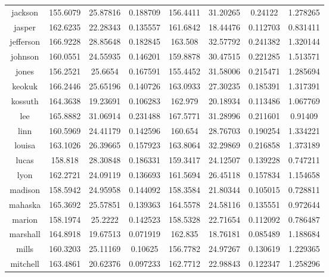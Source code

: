 \begin{table}[H]
\begin{tabular}{|c|ccc|ccc|c|}
jackson       & 155.6079 & 25.87816       & 0.188709 & 156.4411 & 31.20265       & 0.24122  & 1.278265 \\
jasper        & 162.6235 & 22.28343       & 0.135557 & 161.6842 & 18.44476       & 0.112703 & 0.831411 \\
jefferson     & 166.9228 & 28.85648       & 0.182845 & 163.508  & 32.57792       & 0.241382 & 1.320144 \\
johnson       & 160.0551 & 24.55935       & 0.146201 & 159.8878 & 30.47515       & 0.221285 & 1.513571 \\
jones         & 156.2521 & 25.6654        & 0.167591 & 155.4452 & 31.58006       & 0.215471 & 1.285694 \\
keokuk        & 166.2446 & 25.65196       & 0.140726 & 163.0933 & 27.30235       & 0.185391 & 1.317391 \\
kossuth       & 164.3638 & 19.23691       & 0.106283 & 162.979  & 20.18934       & 0.113486 & 1.067769 \\
lee           & 165.8882 & 31.06914       & 0.231488 & 167.5771 & 31.28996       & 0.211601 & 0.91409  \\
linn          & 160.5969 & 24.41179       & 0.142596 & 160.654  & 28.76703       & 0.190254 & 1.334221 \\
louisa        & 163.1026 & 26.39665       & 0.157923 & 163.8064 & 32.29869       & 0.216858 & 1.373189 \\
lucas         & 158.818  & 28.30848       & 0.186331 & 159.3417 & 24.12507       & 0.139228 & 0.747211 \\
lyon          & 162.2721 & 24.09119       & 0.136693 & 161.5694 & 26.45118       & 0.157834 & 1.154658 \\
madison       & 158.5942 & 24.95958       & 0.144092 & 158.3584 & 21.80344       & 0.105015 & 0.728811 \\
mahaska       & 165.3692 & 25.57851       & 0.139363 & 164.5578 & 24.58116       & 0.135551 & 0.972644 \\
marion        & 158.1974 & 25.2222        & 0.142523 & 158.5328 & 22.71654       & 0.112092 & 0.786487 \\
marshall      & 164.8918 & 19.67513       & 0.071919 & 162.835  & 18.76181       & 0.085489 & 1.188684 \\
mills         & 160.3203 & 25.11169       & 0.10625  & 156.7782 & 24.97267       & 0.130619 & 1.229365 \\
mitchell      & 163.4861 & 20.62376       & 0.097233 & 162.7712 & 22.98843       & 0.122347 & 1.258296 \\

\end{tabular}
\end{table}
